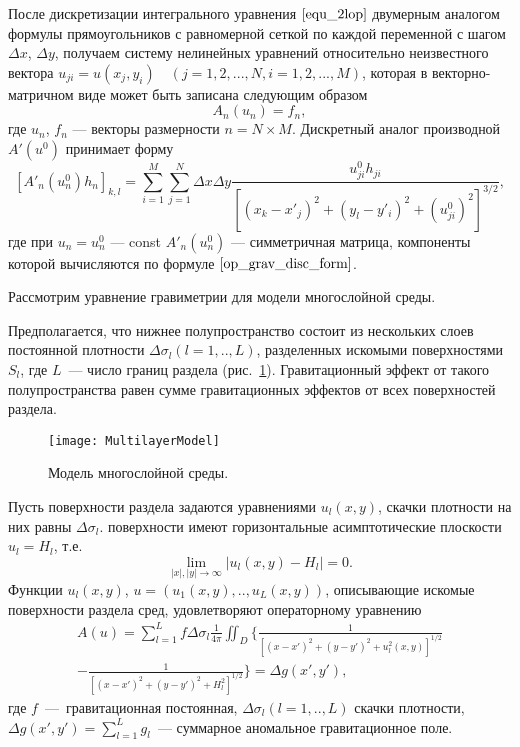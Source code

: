 После дискретизации интегрального уравнения $\eqref{equ_2lop}$ двумерным аналогом формулы прямоугольников с равномерной сеткой по каждой переменной с шагом $\Delta x$, $\Delta y$, получаем систему нелинейных уравнений относительно неизвестного вектора $u_{ji}=u(x_j,y_i)\quad (j=1,2,...,N, i=1,2,...,M)$, которая в векторно-матричном виде может быть записана следующим образом
\begin{equation}\label{equ_snle}
A_n(u_n)=f_n,
\end{equation}
где $u_n$, $f_n$ --- векторы размерности $n=N\times M$. Дискретный аналог производной $A'(u^0)$ принимает форму
\begin{equation}\label{op_grav_disc_form}
[A'_n(u_n^0)h_n]_{k,l}=\sum\limits_{i=1}^{M}\sum\limits_{j=1}^{N}
\Delta x\Delta y\frac{u^0_{ji}h_{ji}}{[(x_k-x'_j)^2+(y_l-y'_i)^2+(u^0_{ji})^2]^{3/2}},
\end{equation}
где при $u_n=u_{n}^{0}$ --- const $A'_n(u_n^0)$ --- симметричная матрица, компоненты которой вычисляются по формуле $\eqref{op_grav_disc_form}$.

Рассмотрим уравнение гравиметрии для модели многослойной среды. 

Предполагается, что нижнее полупространство состоит из нескольких слоев постоянной плотности $\Delta\sigma_l(l=1,..,L)$, разделенных искомыми поверхностями $S_l$, где $L$~--- число границ раздела (рис.~\ref{fig:multlayer}). Гравитационный эффект от такого полупространства равен сумме гравитационных эффектов от всех поверхностей раздела.
\begin{figure}
	\centering
	\texttt{[image: MultilayerModel]}
	\caption{Модель многослойной среды.}
	\label{fig:multlayer}
\end{figure}
Пусть поверхности раздела задаются уравнениями $u_l(x,y)$, скачки плотности на них равны $\Delta\sigma_l$. поверхности имеют горизонтальные асимптотические плоскости $u_l=H_l$, т.е. $$\lim_{|x|,|y|\to\infty}|u_l(x,y)-H_l|=0.$$ Функции $u_l(x,y)$, $u=(u_1(x,y), .., u_L(x,y))$, описывающие искомые поверхности раздела сред, удовлетворяют операторному уравнению
\begin{equation}\label{equ_grav}
\begin{aligned}
A(u)=\sum_{l=1}^{L}f\Delta\sigma_l\frac{1}{4\pi}\iint_D\bigg\{\frac{1}{[(x-x')^2+(y-y')^2+u_l^2(x,y)]^{1/2}} \\
-\frac{1}{[(x-x')^2+(y-y')^2+H_l^2]^{1/2}}\bigg\}=\Delta g(x',y'),
\end{aligned}
\end{equation}
где $f$~---~гравитационная постоянная, $\Delta\sigma_l(l=1,..,L)$ скачки плотности, $\Delta g(x',y')=\sum_{l=1}^{L}g_l$~--- суммарное аномальное гравитационное поле. 

